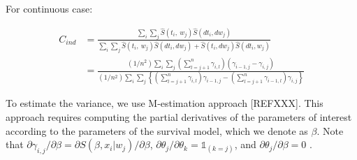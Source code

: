 \documentclass[]{article}\usepackage[]{graphicx}\usepackage[]{color}
\begin{document}
\begin{align*}
\end{align*}

For continuous case:

\begin{align*}
  C_{ind} &= \frac{ \sum_i \sum_j \widehat{S} (t_i, ~w_j) \widehat{S} (dt_i, dw_j)     }{    \sum_i \sum_j \widehat{S} (t_i, ~w_j) \widehat{S} (dt_i, dw_j) + \widehat{S} (t_i, dw_j) \widehat{S} (dt_i, w_j)}\\
  & = \frac{ (1/n^2)   \sum_i \sum_j   \left(  \sum_{l=j+1}^n \gamma_{i,l}   \right)  \left(    \gamma_{i-1,j} - \gamma_{i,j}   \right)       }{    (1/n^2) \sum_i \sum_j   \left\{  \left(  \sum_{l=j+1}^n \gamma_{i,l}  \right)  \gamma_{i-1,j}  - 
  \left(   \sum_{l=j+1}^n \gamma_{i-1,l}  \right) \gamma_{i,j} \right\}   }
\end{align*}

To estimate the variance, we use M-estimation approach [REFXXX]. This approach requires computing the partial derivatives of the parameters of interest according to the parameters of the survival model, which we denote as $\beta$. Note that $\partial \gamma_{i,j}/ \partial \beta = \partial S(\beta, x_i|w_j)/ \partial \beta$, $\partial \theta_j/ \partial \theta_k = \mathds{1}_{(k = j)}$, and $\partial \theta_j/ \partial \beta = 0$ .
\end{document}
